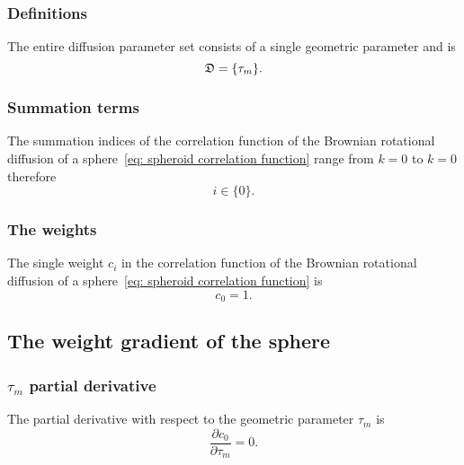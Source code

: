 \subsubsection{Definitions}

The entire diffusion parameter set consists of a single geometric parameter and is
\begin{equation}
    \mathfrak{D} = \{ \tau_m \}.
\end{equation}



\subsubsection{Summation terms}

The summation indices of the correlation function of the Brownian rotational diffusion of a sphere~\eqref{eq: spheroid correlation function} range from $k = 0$ to $k = 0$ therefore
\begin{equation}
    i \in \{ 0 \}.
\end{equation}


\subsubsection{The weights}

The single weight $c_i$ in the correlation function of the Brownian rotational diffusion of a sphere~\eqref{eq: spheroid correlation function} is
\begin{equation}
    c_{0} = 1.
\end{equation}




\subsection{The weight gradient of the sphere}


\subsubsection{$\tau_m$ partial derivative}

The partial derivative with respect to the geometric parameter $\tau_m$ is
\begin{equation}
    \frac{\partial c_{0}}{\partial \tau_m} = 0.
\end{equation}




